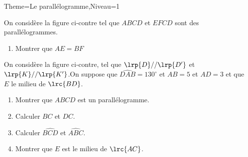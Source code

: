 \documentclass[a4paper,12pt]{article}
\begin{document}
\begin{Maquette}[Fiche]{Theme=Le parallélogramme,Niveau=1}
\begin{exercice}
\begin{minipage}{0.5\linewidth}
On considère la figure ci-contre tel que $ABCD$ et $EFCD$ sont des parallélogrammes.
\begin{enumerate}
\item Montrer que $AE=BF$
\end{enumerate}
\end{minipage}%
\begin{minipage}{0.5\linewidth}
\end{minipage}
\end{exercice}

\begin{exercice}
\begin{minipage}{0.6\linewidth}
On considère la figure ci-contre, tel que $\lrp{D}//\lrp{D'}$ et $\lrp{K}//\lrp{K'}$.On suppose que $\widehat{DAB}=130^{\circ}$ et $AB=5$ et $AD=3$ et que $E$ le milieu de $\lrc{BD}$.
\begin{enumerate}
\item Montrer que $ABCD$ est un parallélogramme.
\item Calculer $BC$ et $DC$.
\item Calculer $\widehat{BCD}$ et $\widehat{ABC}$.
\item Montrer que $E$ est le milieu de $\lrc{AC}$.
\end{enumerate}
\end{minipage}%
\begin{minipage}{0.4\linewidth}
\end{minipage}

\end{exercice}




















\end{Maquette}
\end{document}
